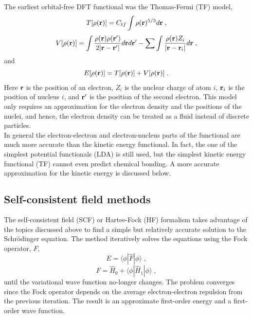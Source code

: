 \documentclass[12pt]{report}
\begin{document}
The earliest orbital-free DFT functional was the Thomas-Fermi (TF) model,
\begin{equation}
 T[\rho({\textbf r})] = C_{tf}\int \rho({\textbf r})^{5/3}d{\textbf r} \; ,
\end{equation}
\begin{equation}
 V[\rho({\textbf r})] = \int
 \frac{\rho({\textbf r})\rho({\textbf r}')}{2|{\textbf r}-{\textbf r}'|}
 d{\textbf r}d{\textbf r}'
 -\sum \int \frac{\rho({\textbf r})Z_i}{|{\textbf r}-{\textbf r}_i|}
 d{\textbf r} \; ,
\end{equation}
and
\begin{equation}
 E[\rho({\textbf r})] = T[\rho({\textbf r})]+V[\rho({\textbf r})] \; .
\end{equation}
Here ${\textbf r}$ is the position of an electron, $Z_i$ is the nuclear charge
of atom $i$, ${\textbf r}_i$ is the position of nucleus $i$, and
${\textbf r}'$ is the position of the second electron. This model only
requires an approximation for the electron density and the positions of the
nuclei, and hence, the electron density can be treated as a fluid instead of
discrete particles. \\

In general the electron-electron and electron-nucleus parts of the functional
are much more accurate than the kinetic energy functional. In fact, the one of
the simplest potential functionals (LDA) is still used, but the simplest
kinetic energy functional (TF) cannot even predict chemical bonding. A more
accurate approximation for the kinetic energy is discussed below.

\subsection{Self-consistent field methods}

The self-consistent field (SCF) or Hartee-Fock (HF) formalism takes advantage
of the topics discussed above to find a simple but relatively accurate
solution to the Schr\"{o}dinger equation. The method iteratively solves the
equations using the Fock operator, $F$,
\begin{equation}
 E = \langle\phi|\hat F|\phi\rangle \; ,
\end{equation}
\begin{equation}
 \hat F = \hat H_0+\langle\phi|\hat H_1|\phi\rangle \; ,
\end{equation}
until the variational wave function no-longer changes. The problem converges
since the Fock operator depends on the average electron-electron repulsion
from the previous iteration. The result is an approximate first-order energy
and a first-order wave function. \\
\end{document}
